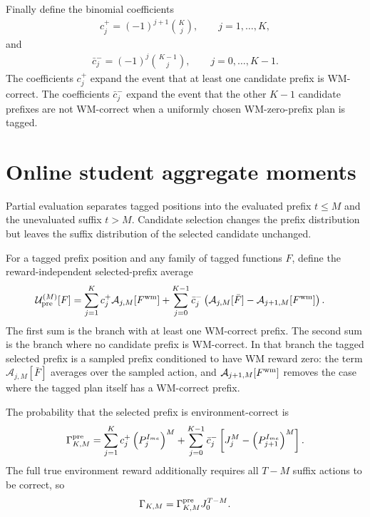 \documentclass{article}
\begin{document}
Finally define the binomial coefficients
\begin{align}
c_j^+=(-1)^{j+1}\binom Kj, \qquad j=1,\ldots,K,
\end{align}
and
\begin{align}
\bar c_j^-=(-1)^j\binom{K-1}{j}, \qquad j=0,\ldots,K-1.
\end{align}
The coefficients $c_j^+$ expand the event that at least one candidate prefix is WM-correct. The coefficients $\bar c_j^-$ expand the event that the other $K-1$ candidate prefixes are not WM-correct when a uniformly chosen WM-zero-prefix plan is tagged.

\section{Online student aggregate moments}

Partial evaluation separates tagged positions into the evaluated prefix $t\leq M$ and the unevaluated suffix $t>M$. Candidate selection changes the prefix distribution but leaves the suffix distribution of the selected candidate unchanged.

For a tagged prefix position and any family of tagged functions $F$, define the reward-independent selected-prefix average
\begin{align}
\mathcal U_{\rm pre}^{(M)}[F] &= \sum_{j=1}^K c_j^+\mathcal A_{j,M}[F^{\rm wm}] + \sum_{j=0}^{K-1}\bar c_j^- \left(\mathcal A_{j,M}[\bar F]-\mathcal A_{j+1,M}[F^{\rm wm}]\right).
\end{align}
The first sum is the branch with at least one WM-correct prefix. The second sum is the branch where no candidate prefix is WM-correct. In that branch the tagged selected prefix is a sampled prefix conditioned to have WM reward zero: the term $\mathcal A_{j,M}[\bar F]$ averages over the sampled action, and $\mathcal A_{j+1,M}[F^{\rm wm}]$ removes the case where the tagged plan itself has a WM-correct prefix.

The probability that the selected prefix is environment-correct is
\begin{align}
\Gamma_{K,M}^{\rm pre} = \sum_{j=1}^K c_j^+\left(P_j^{I_{me}}\right)^M + \sum_{j=0}^{K-1}\bar c_j^- \left[J_j^M-\left(P_{j+1}^{I_{me}}\right)^M\right].
\end{align}
The full true environment reward additionally requires all $T-M$ suffix actions to be correct, so
\begin{align}
\Gamma_{K,M} =\Gamma_{K,M}^{\rm pre}J_0^{T-M}.
\end{align}
\end{document}
